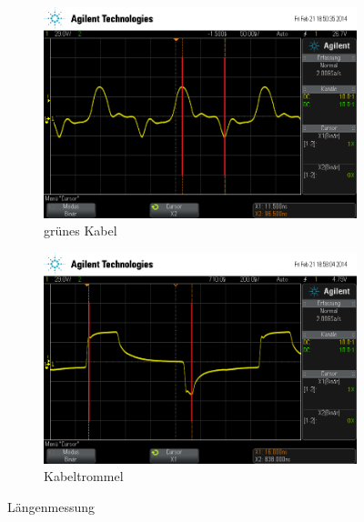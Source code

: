 \begin{figure}
  \begin{subfigure}{0.4\textwidth}
    \includegraphics[width=\textwidth]{laenge_gruen.png}
    \caption{grünes Kabel}
    \label{fig:laenge_gruen}  
  \end{subfigure}
  \quad
  \begin{subfigure}{0.4\textwidth}
    \includegraphics[width=\textwidth]{laenge_trommel.png}
    \caption{Kabeltrommel}
    \label{fig:laenge_trommel}
  \end{subfigure}

  \caption{Längenmessung}
\end{figure}
%
\FloatBarrier
%
